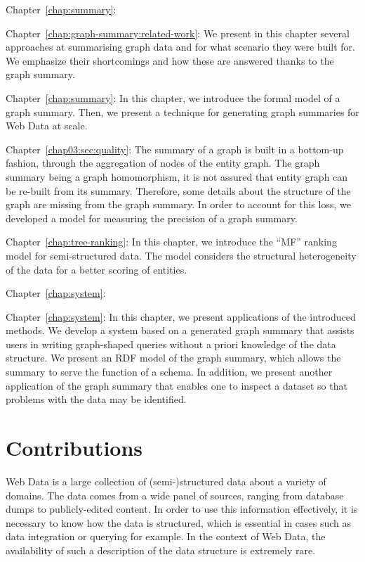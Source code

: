 \begin{labeling}{Chapter~\ref{chap:summary}:}
\item[Chapter~\ref{chap:graph-summary:related-work}:] We present in this chapter several approaches at summarising graph data and for what scenario they were built for. We emphasize their shortcomings and how these are answered thanks to the graph summary.
\item[Chapter~\ref{chap:summary}:] In this chapter, we introduce the formal model of a graph summary. Then, we present a technique for generating graph summaries for Web Data at scale.
\item[Chapter~\ref{chap03:sec:quality}:] The summary of a graph is built in a bottom-up fashion, through the aggregation of nodes of the entity graph. The graph summary being a graph homomorphism, it is not assured that entity graph can be re-built from its summary. Therefore, some details about the structure of the graph are missing from the graph summary. In order to account for this loss, we developed a model for measuring the precision of a graph summary.
\item[Chapter~\ref{chap:tree-ranking}:] In this chapter, we introduce the ``MF'' ranking model for semi-structured data. The model considers the structural heterogeneity of the data for a better scoring of entities.
\end{labeling}


\begin{labeling}{Chapter~\ref{chap:system}:}
\item[Chapter~\ref{chap:system}:] In this chapter, we present applications of the introduced methods. We develop a system based on a generated graph summary that assists users in writing graph-shaped queries without a priori knowledge of the data structure. We present an RDF model of the graph summary, which allows the summary to serve the function of a schema. In addition, we present another application of the graph summary that enables one to inspect a dataset so that problems with the data may be identified.
\end{labeling}

\section{Contributions}

Web Data is a large collection of (semi-)structured data about a variety of domains. The data comes from a wide panel of sources, ranging from database dumps to publicly-edited content. In order to use this information effectively, it is necessary to know how the data is structured, which is essential in cases such as data integration or querying for example. In the context of Web Data, the availability of such a description of the data structure is extremely rare.

